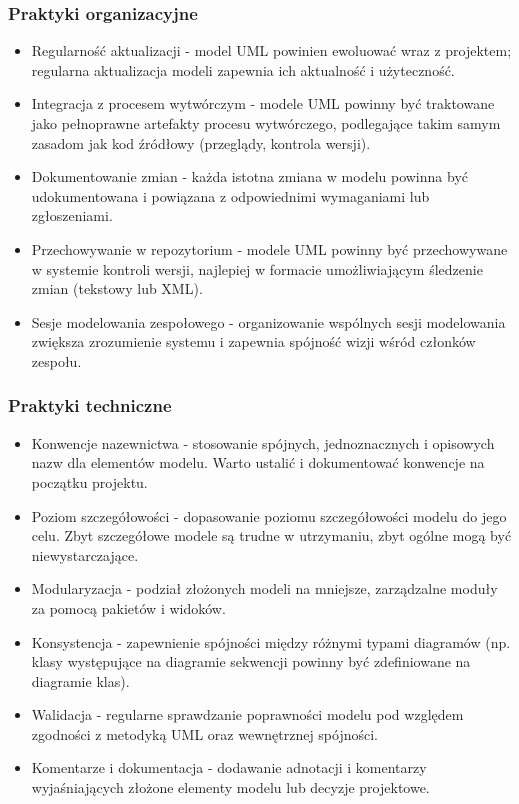 \documentclass[12pt,a4paper]{article}
\begin{document}
\subsubsection{Praktyki organizacyjne}
\begin{itemize}
    \item Regularność aktualizacji - model UML powinien ewoluować wraz z projektem; regularna aktualizacja modeli zapewnia ich aktualność i użyteczność.
    
    \item Integracja z procesem wytwórczym - modele UML powinny być traktowane jako pełnoprawne artefakty procesu wytwórczego, podlegające takim samym zasadom jak kod źródłowy (przeglądy, kontrola wersji).
    
    \item Dokumentowanie zmian - każda istotna zmiana w modelu powinna być udokumentowana i powiązana z odpowiednimi wymaganiami lub zgłoszeniami.
    
    \item Przechowywanie w repozytorium - modele UML powinny być przechowywane w systemie kontroli wersji, najlepiej w formacie umożliwiającym śledzenie zmian (tekstowy lub XML).
    
    \item Sesje modelowania zespołowego - organizowanie wspólnych sesji modelowania zwiększa zrozumienie systemu i zapewnia spójność wizji wśród członków zespołu.
\end{itemize}

\subsubsection{Praktyki techniczne}
\begin{itemize}
    \item Konwencje nazewnictwa - stosowanie spójnych, jednoznacznych i opisowych nazw dla elementów modelu. Warto ustalić i dokumentować konwencje na początku projektu.
    
    \item Poziom szczegółowości - dopasowanie poziomu szczegółowości modelu do jego celu. Zbyt szczegółowe modele są trudne w utrzymaniu, zbyt ogólne mogą być niewystarczające.
    
    \item Modularyzacja - podział złożonych modeli na mniejsze, zarządzalne moduły za pomocą pakietów i widoków.
    
    \item Konsystencja - zapewnienie spójności między różnymi typami diagramów (np. klasy występujące na diagramie sekwencji powinny być zdefiniowane na diagramie klas).
    
    \item Walidacja - regularne sprawdzanie poprawności modelu pod względem zgodności z metodyką UML oraz wewnętrznej spójności.
    
    \item Komentarze i dokumentacja - dodawanie adnotacji i komentarzy wyjaśniających złożone elementy modelu lub decyzje projektowe.
\end{itemize}
\end{document}
